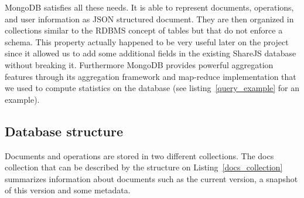 \documentclass{llncs}
\begin{document}
MongoDB satisfies all these needs. It is able to represent documents, operations,
and user information as JSON structured document. They are then organized in
collections similar to the RDBMS concept of tables but that do not enforce a schema.
This property actually happened to be very useful later on the project since it
allowed us to add some additional fields in the existing ShareJS database without
breaking it. Furthermore MongoDB provides powerful aggregation features through
its aggregation framework and map-reduce implementation that we used to compute
statistics on the database (see listing~\ref{query_example} for an example).

\subsection{Database structure}

Documents and operations are stored in two different collections. The docs
collection that can be described by the structure on
Listing~\ref{docs_collection} summarizes information about documents such
as the current version, a snapshot of this version and some metadata.

\end{document}
